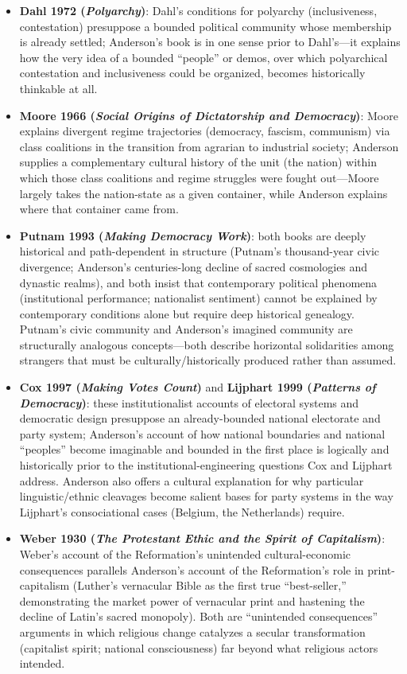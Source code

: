 \documentclass[12pt]{article}
\begin{document}
\begin{itemize}[leftmargin=*, itemsep=4pt]
    \item \textbf{Dahl 1972 (\textit{Polyarchy})}: Dahl's conditions for polyarchy (inclusiveness, contestation) presuppose a bounded political community whose membership is already settled; Anderson's book is in one sense prior to Dahl's---it explains how the very idea of a bounded ``people'' or demos, over which polyarchical contestation and inclusiveness could be organized, becomes historically thinkable at all.
    \item \textbf{Moore 1966 (\textit{Social Origins of Dictatorship and Democracy})}: Moore explains divergent regime trajectories (democracy, fascism, communism) via class coalitions in the transition from agrarian to industrial society; Anderson supplies a complementary cultural history of the unit (the nation) within which those class coalitions and regime struggles were fought out---Moore largely takes the nation-state as a given container, while Anderson explains where that container came from.
    \item \textbf{Putnam 1993 (\textit{Making Democracy Work})}: both books are deeply historical and path-dependent in structure (Putnam's thousand-year civic divergence; Anderson's centuries-long decline of sacred cosmologies and dynastic realms), and both insist that contemporary political phenomena (institutional performance; nationalist sentiment) cannot be explained by contemporary conditions alone but require deep historical genealogy. Putnam's civic community and Anderson's imagined community are structurally analogous concepts---both describe horizontal solidarities among strangers that must be culturally/historically produced rather than assumed.
    \item \textbf{Cox 1997 (\textit{Making Votes Count})} and \textbf{Lijphart 1999 (\textit{Patterns of Democracy})}: these institutionalist accounts of electoral systems and democratic design presuppose an already-bounded national electorate and party system; Anderson's account of how national boundaries and national ``peoples'' become imaginable and bounded in the first place is logically and historically prior to the institutional-engineering questions Cox and Lijphart address. Anderson also offers a cultural explanation for why particular linguistic/ethnic cleavages become salient bases for party systems in the way Lijphart's consociational cases (Belgium, the Netherlands) require.
    \item \textbf{Weber 1930 (\textit{The Protestant Ethic and the Spirit of Capitalism})}: Weber's account of the Reformation's unintended cultural-economic consequences parallels Anderson's account of the Reformation's role in print-capitalism (Luther's vernacular Bible as the first true ``best-seller,'' demonstrating the market power of vernacular print and hastening the decline of Latin's sacred monopoly). Both are ``unintended consequences'' arguments in which religious change catalyzes a secular transformation (capitalist spirit; national consciousness) far beyond what religious actors intended.

\end{itemize}
\end{document}
